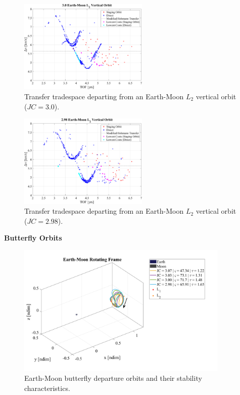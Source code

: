 \begin{figure}[ht]
    \centering
    \includegraphics[width=0.55\textwidth]{figures/TradeSpace_L2Vertical_3_00.pdf}
    \caption{Transfer tradespace departing from an Earth-Moon $L_{2}$ vertical orbit ($JC=3.0$).}
\end{figure}

\begin{figure}[ht]
    \centering
    \includegraphics[width=0.55\textwidth]{figures/TradeSpace_L2Vertical_2_98.pdf}
    \caption{Transfer tradespace departing from an Earth-Moon $L_{2}$ vertical orbit ($JC=2.98$).}
\end{figure}
\clearpage

\textbf{Butterfly Orbits}
\begin{figure}[ht]
    \centering
    \includegraphics[width=0.9\textwidth]{figures/ButterflyDepartureOrbits.pdf}
    \caption{Earth-Moon butterfly departure orbits and their stability characteristics.}
\end{figure}


